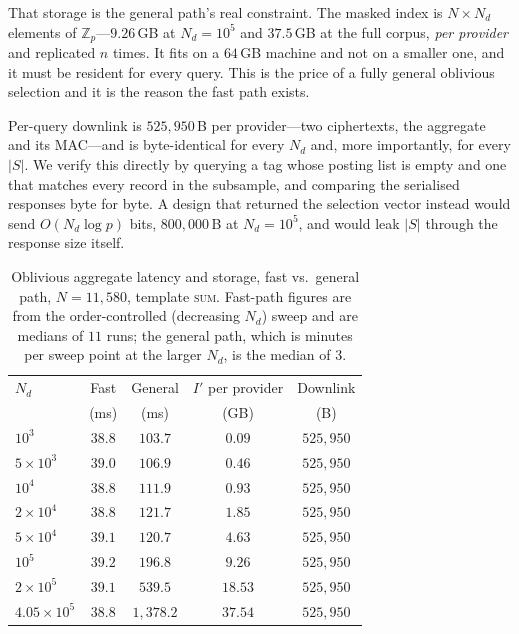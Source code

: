 \documentclass[journal]{IEEEtran}
\begin{document}
That storage is the general path's real constraint. The masked index is
$N\times N_d$ elements of $\mathbb{Z}_p$---$9.26$\,GB at $N_d=10^5$ and
$37.5$\,GB at the full corpus, \emph{per provider} and replicated $n$ times. It
fits on a $64$\,GB machine and not on a smaller one, and it must be resident for
every query. This is the price of a fully general oblivious selection and it is
the reason the fast path exists.

Per-query downlink is $525{,}950$\,B per provider---two ciphertexts, the
aggregate and its MAC---and is byte-identical for every $N_d$ and, more
importantly, for every $|S|$. We verify this directly by querying a tag whose
posting list is empty and one that matches every record in the subsample, and
comparing the serialised responses byte for byte. A design that returned the
selection vector instead would send $O(N_d\log p)$ bits, $800{,}000$\,B at
$N_d=10^5$, and would leak $|S|$ through the response size itself.

\begin{table}[t]
\centering
\caption{Oblivious aggregate latency and storage, fast vs.\ general path,
$N=11{,}580$, template \textsc{sum}. Fast-path figures are from the
order-controlled (decreasing $N_d$) sweep and are medians of $11$ runs; the
general path, which is minutes per sweep point at the larger $N_d$, is the
median of $3$.}
\label{tab:compute}
\footnotesize
\renewcommand{\arraystretch}{1.2}
\begin{tabular*}{\columnwidth}{@{\extracolsep{\fill}}lcccc@{}}
\toprule
$N_d$ & Fast & General & $I'$ per provider & Downlink \\
      & (ms) & (ms)     & (GB)              & (B) \\
\midrule
$10^3$             & $38.8$ & $103.7$   & $0.09$  & $525{,}950$ \\
$5\times10^3$      & $39.0$ & $106.9$   & $0.46$  & $525{,}950$ \\
$10^4$             & $38.8$ & $111.9$   & $0.93$  & $525{,}950$ \\
$2\times10^4$      & $38.8$ & $121.7$   & $1.85$  & $525{,}950$ \\
$5\times10^4$      & $39.1$ & $120.7$   & $4.63$  & $525{,}950$ \\
$10^5$             & $39.2$ & $196.8$   & $9.26$  & $525{,}950$ \\
$2\times10^5$      & $39.1$ & $539.5$   & $18.53$ & $525{,}950$ \\
$4.05\times10^5$   & $38.8$ & $1{,}378.2$ & $37.54$ & $525{,}950$ \\
\bottomrule
\end{tabular*}
\end{table}
\end{document}

